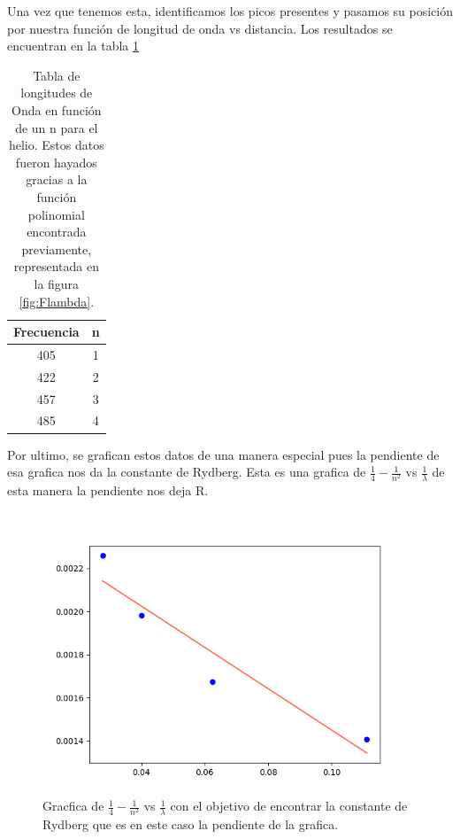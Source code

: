 \documentclass[a4paper, amsfonts, amssymb, amsmath, reprint, showkeys, nofootinbib, twoside]{revtex4-1}
\begin{document}
Una vez que tenemos esta, identificamos los picos presentes y pasamos su posición por nuestra función de longitud de onda vs distancia. Los resultados se encuentran en la tabla \ref{table:Flambda}
\begin{table}[h]
    \centering
    \caption{Tabla de longitudes de Onda en función de un n para el helio. Estos datos fueron hayados gracias a la función polinomial encontrada previamente, representada en la figura \ref{fig:Flambda}.}
    \label{table:Flambda}
    \begin{tabular}{|c|c|}
        \hline
        \hline
        Frecuencia & n \\
        \hline
        405 & 1 \\
        422 & 2\\
        457 & 3\\
        485 & 4\\
        \hline
        \hline
    \end{tabular}
\end{table}
Por ultimo, se grafican estos datos de una manera especial pues la pendiente de esa grafica nos da la constante de Rydberg. Esta es una grafica de $\frac{1}{4}-\frac{1}{n^2}$ vs $ \frac{1}{\lambda}$ de esta manera la pendiente nos deja R.
\begin{figure}[H]
    \centering
    \includegraphics[scale=0.5]{Graficas/grafica_mr.png}
    \caption{Gracfica de $\frac{1}{4}-\frac{1}{n^2}$ vs $\frac{1}{\lambda}$ con el objetivo de encontrar la constante de Rydberg que es en este caso la pendiente de la grafica.}
    \label{fig:mr}
\end{figure}
\end{document}
